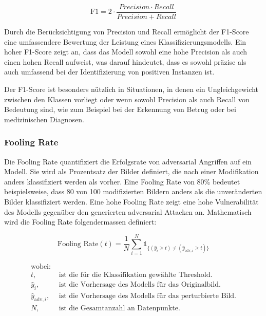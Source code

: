 \begin{equation}
    \text{F1} = 2 \cdot \frac{Precision \cdot Recall}{Precision + Recall}
    \label{eq:F1Score}
\end{equation}

Durch die Berücksichtigung von Precision und Recall ermöglicht der F1-Score eine umfassendere Bewertung der Leistung eines Klassifizierungsmodells. Ein hoher F1-Score zeigt an, dass das Modell sowohl eine hohe Precision als auch einen hohen Recall aufweist, was darauf hindeutet, dass es sowohl präzise als auch umfassend bei der Identifizierung von positiven Instanzen ist.

Der F1-Score ist besonders nützlich in Situationen, in denen ein Ungleichgewicht zwischen den Klassen vorliegt oder wenn sowohl Precision als auch Recall von Bedeutung sind, wie zum Beispiel bei der Erkennung von Betrug oder bei medizinischen Diagnosen.


\subsubsection{Fooling Rate} \label{chap:fooling rate}
Die Fooling Rate quantifiziert die Erfolgsrate von adversarial Angriffen auf ein Modell. Sie wird als Prozentsatz der Bilder definiert, die nach einer Modifikation anders klassifiziert werden als vorher. Eine Fooling Rate von 80\% bedeutet beispielsweise, dass 80 von 100 modifizierten Bildern anders als die unveränderten Bilder klassifiziert werden. Eine hohe Fooling Rate zeigt eine hohe Vulnerabilität des Modells gegenüber den generierten adversarial Attacken an. Mathematisch wird die Fooling Rate folgendermassen definiert:

\begin{equation}
    \text{Fooling Rate}(t) = \frac{1}{N} \sum_{i=1}^{N} \mathds{1}_{\{(\hat{y}_i \geq t) \neq (\hat{y}_{\text{adv},i} \geq t)\}}
    \label{eq:Fooling Rate}
\end{equation}

\begin{align*}
\text{wobei:}&\\
t, &\text{ ist die für die Klassifikation gewählte Threshold.}\\
\hat{y}_i, &\text{ ist die Vorhersage des Modells für das Originalbild.} \\
\hat{y}_{\text{adv},i}, &\text{ ist die Vorhersage des Modells für das perturbierte Bild.} \\
N, &\text{ ist die Gesamtanzahl an Datenpunkte.}
\end{align*}

